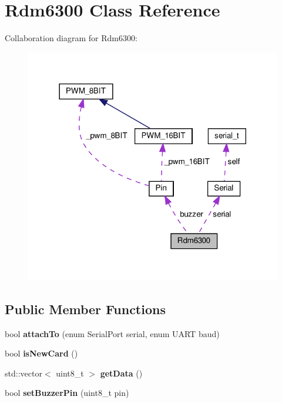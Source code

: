 \hypertarget{classRdm6300}{}\section{Rdm6300 Class Reference}
\label{classRdm6300}


Collaboration diagram for Rdm6300\+:\nopagebreak
\begin{figure}[H]
\begin{center}
\leavevmode
\includegraphics[width=318pt]{classRdm6300__coll__graph}
\end{center}
\end{figure}
\subsection*{Public Member Functions}
\begin{DoxyCompactItemize}
\item 
\mbox{\label{classRdm6300_aff170c6261d9e9364d3592dea5743671}} 
bool {\bfseries attach\+To} (enum Serial\+Port serial, enum U\+A\+RT baud)
\item 
\mbox{\label{classRdm6300_a09b6928f381395bf097db97bab27639d}} 
bool {\bfseries is\+New\+Card} ()
\item 
\mbox{\label{classRdm6300_a26db1ddb2e181b75063681a930ae296a}} 
std\+::vector$<$ uint8\+\_\+t $>$ {\bfseries get\+Data} ()
\item 
\mbox{\label{classRdm6300_ae1b10584606691ff109c5395432e7ef9}} 
bool {\bfseries set\+Buzzer\+Pin} (uint8\+\_\+t pin)
\end{DoxyCompactItemize}
